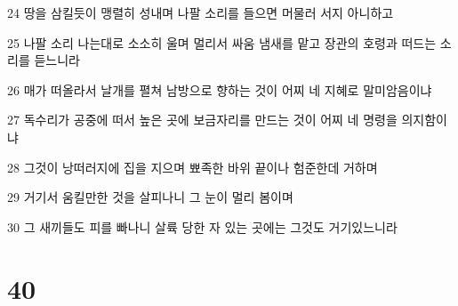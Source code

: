 \par 24 땅을 삼킬듯이 맹렬히 성내며 나팔 소리를 들으면 머물러 서지 아니하고
\par 25 나팔 소리 나는대로 소소히 울며 멀리서 싸움 냄새를 맡고 장관의 호령과 떠드는 소리를 듣느니라
\par 26 매가 떠올라서 날개를 펼쳐 남방으로 향하는 것이 어찌 네 지혜로 말미암음이냐
\par 27 독수리가 공중에 떠서 높은 곳에 보금자리를 만드는 것이 어찌 네 명령을 의지함이냐
\par 28 그것이 낭떠러지에 집을 지으며 뾰족한 바위 끝이나 험준한데 거하며
\par 29 거기서 움킬만한 것을 살피나니 그 눈이 멀리 봄이며
\par 30 그 새끼들도 피를 빠나니 살륙 당한 자 있는 곳에는 그것도 거기있느니라

\chapter{40}

